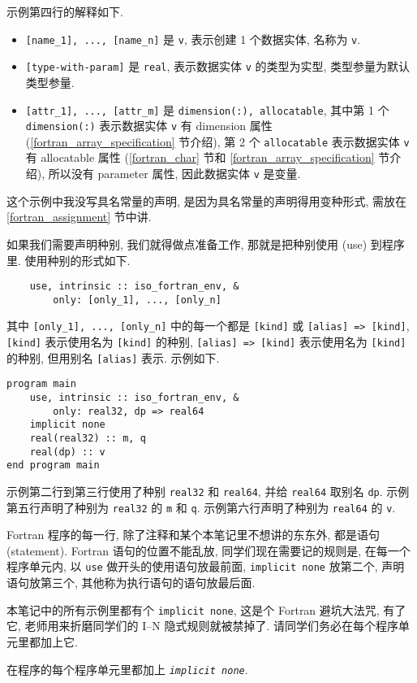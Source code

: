 示例第四行的解释如下.
\begin{itemize}
    \item \texttt{[name\_{}1], ..., [name\_{}n]} 是 \texttt{v}, 表示创建 1 个数据实体, 名称为 \texttt{v}.
    \item \texttt{[type-with-param]} 是 \texttt{real}, 表示数据实体 \texttt{v} 的类型为实型, 类型参量为默认类型参量.
    \item \texttt{[attr\_{}1], ..., [attr\_{}m]} 是 \texttt{dimension(:), allocatable}, 其中第 1 个 \texttt{dimension(:)} 表示数据实体 \texttt{v} 有 dimension 属性 (\ref{fortran_array_specification} 节介绍), 第 2 个 \texttt{allocatable} 表示数据实体 \texttt{v} 有 allocatable 属性 (\ref{fortran_char} 节和 \ref{fortran_array_specification} 节介绍), 所以没有 parameter 属性, 因此数据实体 \texttt{v} 是变量.
\end{itemize}
这个示例中我没写具名常量的声明, 是因为具名常量的声明得用变种形式, 需放在 \ref{fortran_assignment} 节中讲.

如果我们需要声明种别, 我们就得做点准备工作, 那就是把种别使用 (use) 到程序里. 使用种别的形式如下.
\begin{lstlisting}
    use, intrinsic :: iso_fortran_env, &
        only: [only_1], ..., [only_n]
\end{lstlisting}
其中 \texttt{[only\_{}1], ..., [only\_{}n]} 中的每一个都是 \texttt{[kind]} 或 \texttt{[alias] => [kind]}, \texttt{[kind]} 表示使用名为 \texttt{[kind]} 的种别, \texttt{[alias] => [kind]} 表示使用名为 \texttt{[kind]} 的种别, 但用别名 \texttt{[alias]} 表示. 示例如下.
\begin{lstlisting}
program main
    use, intrinsic :: iso_fortran_env, &
        only: real32, dp => real64
    implicit none
    real(real32) :: m, q
    real(dp) :: v
end program main
\end{lstlisting}
示例第二行到第三行使用了种别 \texttt{real32} 和 \texttt{real64}, 并给 \texttt{real64} 取别名 \texttt{dp}. 示例第五行声明了种别为 \texttt{real32} 的 \texttt{m} 和 \texttt{q}. 示例第六行声明了种别为 \texttt{real64} 的 \texttt{v}.

Fortran 程序的每一行, 除了注释和某个本笔记里不想讲的东东外, 都是语句 (statement). Fortran 语句的位置不能乱放, 同学们现在需要记的规则是, 在每一个程序单元内, 以 \texttt{use} 做开头的使用语句放最前面, \texttt{implicit none} 放第二个, 声明语句放第三个, 其他称为执行语句的语句放最后面.

本笔记中的所有示例里都有个 \texttt{implicit none}, 这是个 Fortran 避坑大法咒, 有了它, 老师用来折磨同学们的 I--N 隐式规则就被禁掉了. 请同学们务必在每个程序单元里都加上它.
\begin{convention}
    在程序的每个程序单元里都加上 \texttt{\emph{implicit none}}.
\end{convention}

